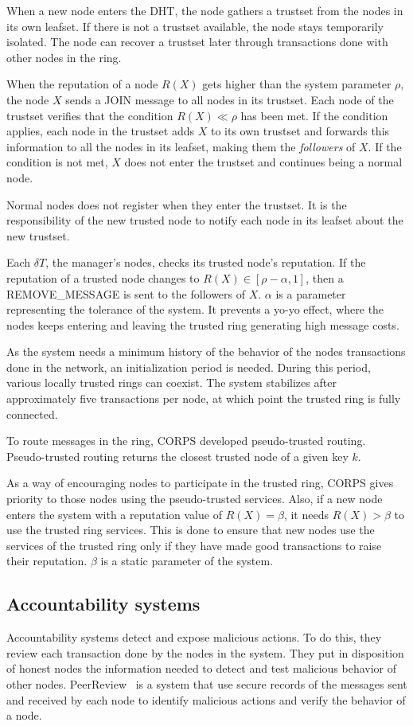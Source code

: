 When a new node enters the DHT, the node gathers a trustset from the nodes in its own
leafset. If there is not a trustset available, the node stays temporarily
isolated. The node can recover a trustset later through transactions done with
other nodes in the ring.

When the reputation of a node $R(X)$ gets higher than the system parameter
$\rho$, the node $X$ sends a JOIN message to all nodes in its trustset. Each
node of the trustset verifies that the condition $R(X) \ll \rho$ has been met.
If the condition  applies, each node in the trustset adds $X$ to its own trustset
and forwards this information to all the nodes in its leafset, making them the
\textit{followers} of $X$.
If the condition is not met, $X$ does not enter the trustset and continues
being a normal node.

Normal nodes does not register when they enter the trustset. It is the
responsibility of the new trusted node to notify each node in its leafset about
the new trustset.

Each $\delta T$, the manager's nodes, checks its trusted node's reputation. If
the reputation of a trusted node changes to $R(X) \in [\rho -\alpha, 1]$, then
a REMOVE\_MESSAGE is sent to the followers of $X$. $\alpha$ is a parameter
representing the tolerance of the system. It prevents a yo-yo effect, where the nodes keeps entering and
leaving the trusted ring generating high message costs.

As the system needs a minimum history of the behavior of the nodes transactions
done in the network, an initialization period is needed. During this period,
various locally trusted rings can coexist.
The system stabilizes after approximately five transactions per node, at which
point the trusted ring is fully connected.

To route messages in the ring, CORPS developed pseudo-trusted routing. Pseudo-trusted routing returns the closest trusted node of a given key $k$.

As a way of encouraging nodes to participate in the trusted ring, CORPS gives
priority to those nodes using the pseudo-trusted services.
Also, if a new node enters the system with a reputation value of $R(X) =
\beta$, it needs $R(X) > \beta$ to use the trusted ring services. This is
done to ensure that new nodes use the services of the trusted ring only if they
have made good transactions to raise their reputation. $\beta$ is a static parameter of the
system. 


\subsection{Accountability systems}
Accountability systems detect and expose malicious actions.
To do this, they review each transaction done by the nodes in the system. They
put in disposition of honest nodes the information needed to detect and test
malicious behavior of other nodes. PeerReview~\cite{haeberlen2007peerreview} is a system that
use secure records of the messages sent and received by each node to identify
malicious actions and verify the behavior of a node.

